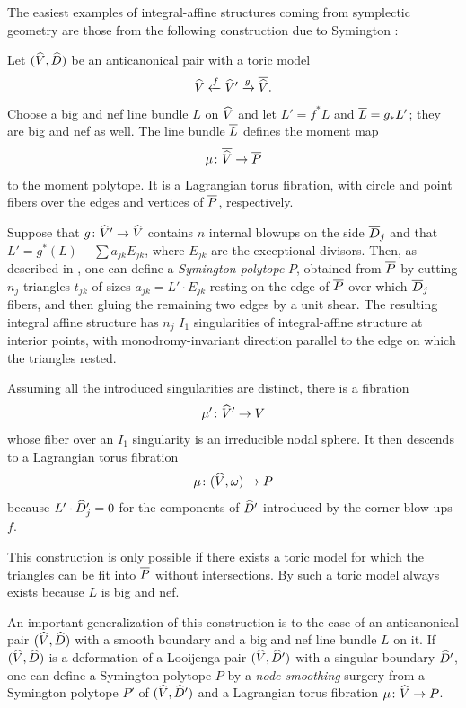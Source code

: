 \documentclass{amsart}
\begin{document}
The easiest examples of integral-affine structures
coming from symplectic geometry are those from the following construction
due to Symington \cite{symington2003four-dimensions}:

\begin{construction}\label{con:ias-antican}
  Let $({\widehat V},{\widehat D})$ be an anticanonical pair with a toric model
  $${\widehat V} \xleftarrow{f} {\widehat V}'\xrightarrow{g} \overline{{\widehat V}}.$$ Choose a
  big and nef line bundle $L$ on ${\widehat V}$ and let $L'=f^*L$ and
  ${\overline L}=g_*L'$; they are big and nef as well.  The line bundle ${\overline L}$
  defines the moment map $$\bar\mu\colon\overline{{\widehat V}}\to {\overline P}$$ to the moment
  polytope. It is a Lagrangian torus fibration, with circle and point fibers
  over the edges and vertices of ${\overline P}$, respectively.
  
  Suppose that $g\colon {\widehat V}'\to {\widehat V}$ contains $n$ internal blowups on
  the side ${\overline D}_j$ and that $L' = g^*(L) - \sum a_{jk}E_{jk}$, where
  $E_{jk}$ are the exceptional divisors. Then, as described in \cite{symington2003four-dimensions},
 one can define a \emph{Symington polytope} $P$, obtained from ${\overline P}$ by
  cutting $n_j$ triangles $t_{jk}$ of sizes $a_{jk} = L'\cdot E_{jk}$ resting
  on the edge of ${\overline P}$ over which ${\overline D}_j$ fibers, and
  then gluing the remaining two edges by a unit shear. The resulting
  integral affine structure has $n_j$  $I_1$ singularities of
  integral-affine structure at interior points, with monodromy-invariant
  direction parallel to the edge on which the triangles rested.
  
Assuming all the introduced singularities are distinct,
there is a fibration $$\mu'\colon {\widehat V}'\to V$$ whose fiber
over an $I_1$ singularity is an irreducible nodal sphere.
 It then descends to
  a Lagrangian torus fibration $$\mu\colon ({\widehat V},\omega)\to P$$
  because $L'\cdot {\widehat D}_j'=0$ for the components of ${\widehat D}'$
  introduced by the corner blow-ups $f$.

  This construction is only possible if there exists a toric model for
  which the triangles can be fit into ${\overline P}$ without intersections. By
  \cite[Thm.~5.3]{engel2021smoothings}
  such a toric model always exists because $L$ is big and nef.
  
  An important generalization of this construction is to the case of
  an anticanonical pair $({\widehat V},{\widehat D})$ with a smooth boundary and a big and nef
  line bundle $L$ on it.  If $({\widehat V},{\widehat D})$ is a deformation of a Looijenga pair
  $({\widehat V},{\widehat D}')$ with a singular boundary ${\widehat D}'$, one
  can define a Symington polytope $P$ by a \emph{node smoothing}
  surgery from a Symington polytope $P'$ of $({\widehat V},{\widehat D}')$ and a
  Lagrangian torus fibration $\mu\colon {\widehat V}\to P$.
\end{construction}
\end{document}
